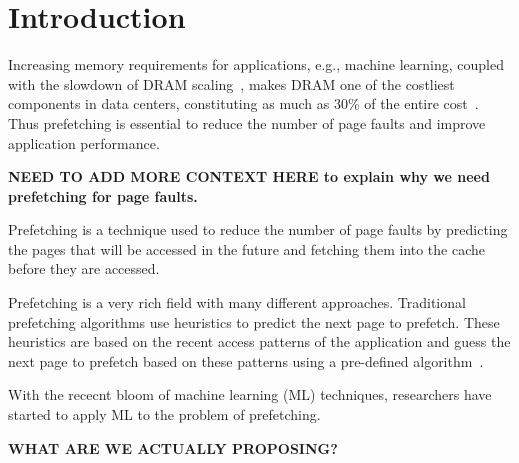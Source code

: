 \section{Introduction}
Increasing memory requirements for applications, e.g., machine learning, coupled with the slowdown of DRAM scaling~\cite{dram-1, dram-2}, makes DRAM one of the costliest components in data centers, constituting as much as 30\% of the entire cost~\cite{meta}. Thus prefetching is essential to reduce the number of page faults and improve application performance.

\textbf{NEED TO ADD MORE CONTEXT HERE to explain why we need prefetching for page faults.}


Prefetching is a technique used to reduce the number of page faults by predicting the pages that will be accessed in the future and fetching them into the cache before they are accessed.


Prefetching is a very rich field with many different approaches. Traditional prefetching algorithms use heuristics to predict the next page to prefetch. These heuristics are based on the recent access patterns of the application and guess the next page to prefetch based on these patterns using a pre-defined algorithm~\cite{Markov, Survey}. 


With the rececnt bloom of machine learning (ML) techniques, researchers have started to apply ML to the problem of prefetching.

\textbf{WHAT ARE WE ACTUALLY PROPOSING?}
